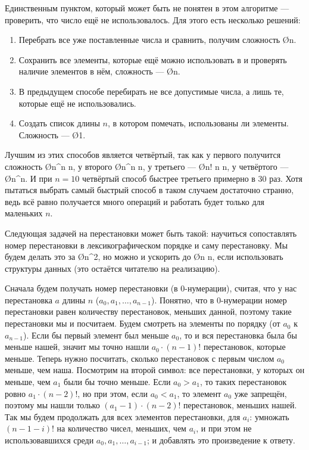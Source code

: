 Единственным пунктом, который может быть не понятен в этом алгоритме — проверить, что число ещё не использовалось. Для этого есть несколько решений:

\begin{enumerate}
    \item Перебрать все уже поставленные числа и сравнить, получим сложность \O{n}.
    \item Сохранить все элементы, которые ещё можно использовать в  и проверять наличие элементов в нём, сложность — \O{\log n}.
    \item В предыдущем способе перебирать не все допустимые числа, а лишь те, которые ещё не использовались.
    \item Создать список длины $n$, в котором помечать, использованы ли элементы. Сложность — \O{1}.
\end{enumerate}

Лучшим из этих способов является четвёртый, так как у первого получится сложность \O{n^n \cdot n}, у второго \O{n^n \cdot \log n}, у третьего — \O{n! \cdot n \log n}, у четвёртого — \O{n^n}. И при $n = 10$ четвёртый способ быстрее третьего примерно в 30 раз. Хотя пытаться выбрать самый быстрый способ в таком случаем достаточно странно, ведь всё равно получается много операций и работать будет только для маленьких $n$.


Следующая задачей на перестановки может быть такой: научиться сопоставлять номер перестановки в лексикографическом порядке и саму перестановку. Мы будем делать это за \O{n^2}, но можно и ускорить до \O{n \log n}, если использовать структуры данных (это остаётся читателю на реализацию). 

Сначала будем получать номер перестановки (в 0-нумерации), считая, что у нас перестановка $a$ длины $n$ ($a_0, a_1, \ldots, a_{n - 1}$). Понятно, что в 0-нумерации номер перестановки равен количеству перестановок, меньших данной, поэтому такие перестановки мы и посчитаем. Будем смотреть на элементы по порядку (от $a_0$ к $a_{n - 1}$). Если бы первый элемент был меньше $a_0$, то и вся перестановка была бы меньше нашей, значит мы точно нашли $a_0 \cdot (n - 1)!$ перестановок, которые меньше. Теперь нужно посчитать, сколько перестановок с первым числом $a_0$ меньше, чем наша. Посмотрим на второй символ: все перестановки, у которых он меньше, чем $a_1$ были бы точно меньше. Если $a_0 > a_1$, то таких перестановок ровно $a_1 \cdot (n - 2)!$, но при этом, если $a_0 < a_1$, то элемент $a_0$ уже запрещён, поэтому мы нашли только $(a_1 - 1) \cdot (n - 2)!$ перестановок, меньших нашей. Так мы будем продолжать для всех элементов перестановки, для $a_i$: умножать $(n - 1 - i)!$  на количество чисел, меньших, чем $a_i$, и при этом не использовавшихся среди $a_0, a_1, \ldots, a_{i - 1}$; и добавлять это произведение к ответу.


